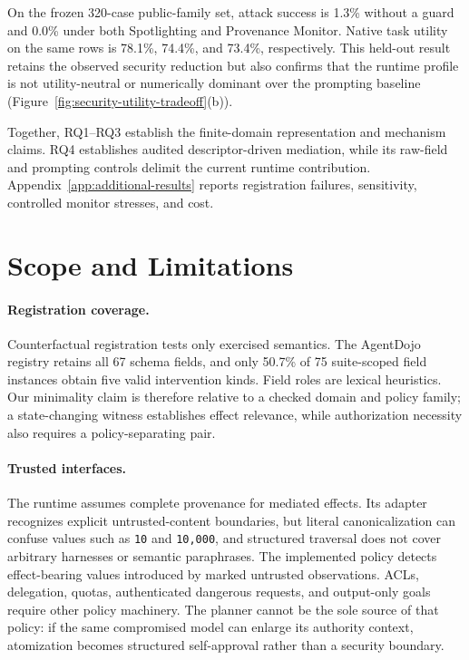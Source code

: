 \documentclass[letterpaper,twocolumn,10pt]{article}
\newcommand{\sys}{Provenance Monitor}
\theoremstyle{definition}
\begin{document}
On the frozen 320-case public-family set, attack success is 1.3\% without a
guard and 0.0\% under both Spotlighting and \sys{}.  Native task utility on the
same rows is 78.1\%, 74.4\%, and 73.4\%, respectively.  This held-out result
retains the observed security reduction but also confirms that the runtime
profile is not utility-neutral or numerically dominant over the prompting
baseline (Figure~\ref{fig:security-utility-tradeoff}(b)).


Together, RQ1--RQ3 establish the finite-domain representation and mechanism
claims.  RQ4 establishes audited descriptor-driven mediation, while its
raw-field and prompting controls delimit the current runtime contribution.
Appendix~\ref{app:additional-results} reports registration failures,
sensitivity, controlled monitor stresses, and cost.

\section{Scope and Limitations}

\paragraph{Registration coverage.}
Counterfactual registration tests only exercised semantics.  The AgentDojo
registry retains all 67 schema fields, and only 50.7\% of 75 suite-scoped field
instances obtain five valid intervention kinds.  Field roles are lexical
heuristics.  Our minimality claim is therefore relative to a checked domain and
policy family; a state-changing witness establishes effect relevance, while
authorization necessity also requires a policy-separating pair.

\paragraph{Trusted interfaces.}
The runtime assumes complete provenance for mediated effects.  Its adapter
recognizes explicit untrusted-content boundaries, but literal canonicalization
can confuse values such as \texttt{10} and \texttt{10,000}, and structured
traversal does not cover arbitrary harnesses or semantic paraphrases.  The
implemented policy detects effect-bearing values introduced by marked
untrusted observations.  ACLs, delegation, quotas, authenticated dangerous
requests, and output-only goals require other policy machinery.
The planner cannot be the sole source of that policy: if the same compromised
model can enlarge its authority context, atomization becomes structured
self-approval rather than a security boundary.
\end{document}
